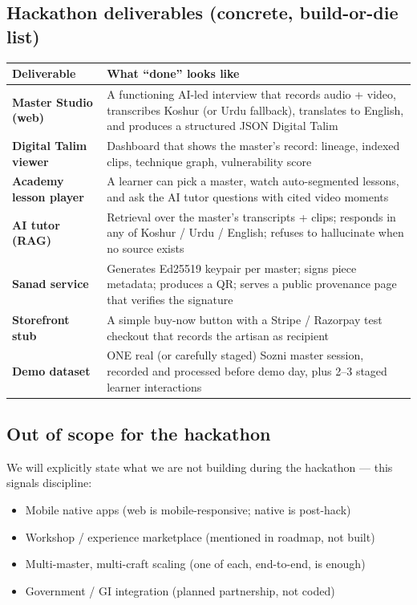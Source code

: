 \documentclass[11pt, a4paper]{article}
\begin{document}
\subsection{Hackathon deliverables (concrete, build-or-die list)}

\begin{center}
\small
\begin{tabularx}{\linewidth}{>{\bfseries}lX}
\toprule
Deliverable & What ``done'' looks like \\
\midrule
Master Studio (web) & A functioning AI-led interview that records audio + video, transcribes Koshur (or Urdu fallback), translates to English, and produces a structured JSON Digital Talim \\
Digital Talim viewer & Dashboard that shows the master's record: lineage, indexed clips, technique graph, vulnerability score \\
Academy lesson player & A learner can pick a master, watch auto-segmented lessons, and ask the AI tutor questions with cited video moments \\
AI tutor (RAG) & Retrieval over the master's transcripts + clips; responds in any of Koshur / Urdu / English; refuses to hallucinate when no source exists \\
Sanad service & Generates Ed25519 keypair per master; signs piece metadata; produces a QR; serves a public provenance page that verifies the signature \\
Storefront stub & A simple buy-now button with a Stripe / Razorpay test checkout that records the artisan as recipient \\
Demo dataset & ONE real (or carefully staged) Sozni master session, recorded and processed before demo day, plus 2--3 staged learner interactions \\
\bottomrule
\end{tabularx}
\end{center}

\subsection{Out of scope for the hackathon}

We will explicitly state what we are not building during the hackathon — this signals discipline:

\begin{itemize}
  \item Mobile native apps (web is mobile-responsive; native is post-hack)
  \item Workshop / experience marketplace (mentioned in roadmap, not built)
  \item Multi-master, multi-craft scaling (one of each, end-to-end, is enough)
  \item Government / GI integration (planned partnership, not coded)
\end{itemize}
\end{document}
